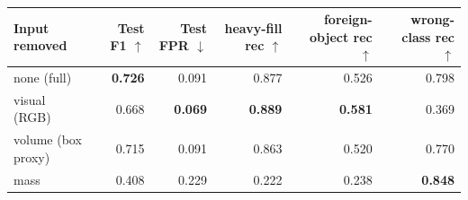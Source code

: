 \begin{table}[tb]
\centering
\caption{}
\label{tab:modality}
\begin{tabular}{lrrrrr}
\toprule
Input removed & Test F1 $\uparrow$ & Test FPR $\downarrow$ & heavy-fill rec $\uparrow$ & foreign-object rec $\uparrow$ & wrong-class rec $\uparrow$ \\
\midrule
none (full) & \textbf{0.726} & 0.091 & 0.877 & 0.526 & 0.798 \\
visual (RGB) & 0.668 & \textbf{0.069} & \textbf{0.889} & \textbf{0.581} & 0.369 \\
volume (box proxy) & 0.715 & 0.091 & 0.863 & 0.520 & 0.770 \\
mass & 0.408 & 0.229 & 0.222 & 0.238 & \textbf{0.848} \\
\bottomrule
\end{tabular}
\end{table}
